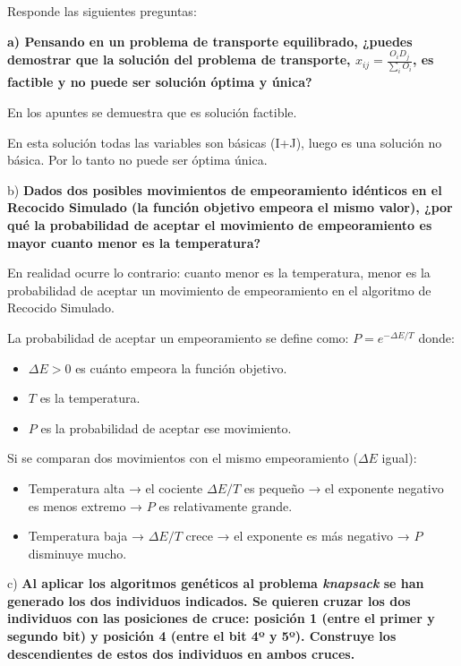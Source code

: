 Responde las siguientes preguntas:

\textbf{a) Pensando en un problema de transporte equilibrado, ¿puedes demostrar que la solución del problema de transporte, $x_{ij}=\frac{O_i D_j }{\sum _i O_i}$, es factible y no puede ser solución óptima y única?}

En los apuntes se demuestra que es solución factible.

En esta solución todas las variables son básicas (I+J), luego es una solución no básica. Por lo tanto no puede ser óptima única.


b) \textbf{Dados dos posibles movimientos de empeoramiento idénticos en el Recocido Simulado (la función objetivo empeora el mismo valor), ¿por qué la probabilidad de aceptar el movimiento de empeoramiento es mayor cuanto menor es la temperatura?}

En realidad ocurre lo contrario: cuanto menor es la temperatura, menor es la probabilidad de aceptar un movimiento de empeoramiento en el algoritmo de Recocido Simulado.

La probabilidad de aceptar un empeoramiento se  define como:  $P = e^{-\Delta E / T}$ donde:

\begin{itemize}
    \item  $\Delta E>0$ es cuánto empeora la función objetivo.
    \item $T$ es la temperatura.
    \item $P$ es la probabilidad de aceptar ese movimiento.
\end{itemize}

Si se comparan dos movimientos con el mismo empeoramiento ($\Delta E$ igual):

\begin{itemize}
    \item Temperatura alta → el cociente $\Delta E/T$ es pequeño → el exponente negativo es menos extremo → $P$ es relativamente grande.
    \item Temperatura baja → $\Delta E/T$ crece → el exponente es más negativo → $P$ disminuye mucho.
\end{itemize}


c) \textbf{Al aplicar los algoritmos genéticos al problema \textit{knapsack} se han generado los dos individuos indicados. Se quieren cruzar los dos individuos con las posiciones de cruce: posición 1 (entre el primer y segundo bit) y posición 4 (entre el bit 4º y 5º). Construye los descendientes de estos dos individuos en ambos cruces.}

